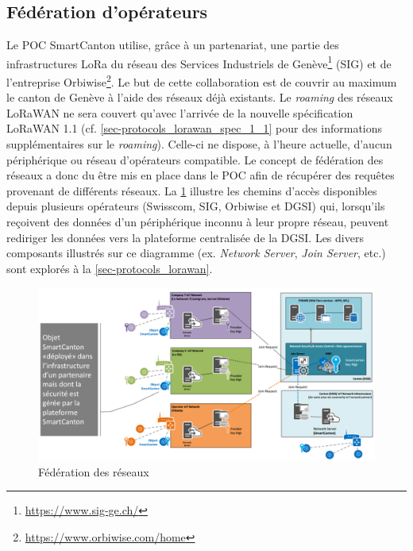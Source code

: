 \subsection{Fédération d'opérateurs}
\label{sec-stateoftheart_smartcanton_federation}

Le POC SmartCanton utilise, grâce à un partenariat, une partie des infrastructures LoRa du réseau des Services Industriels de Genève\footnote{\url{https://www.sig-ge.ch/}} (SIG) et de l'entreprise Orbiwise\footnote{\url{https://www.orbiwise.com/home}}. Le but de cette collaboration est de couvrir au maximum le canton de Genève à l'aide des réseaux déjà existants.
Le \textit{roaming} des réseaux LoRaWAN ne sera couvert qu'avec l'arrivée de la nouvelle spécification LoRaWAN 1.1 (cf. \cref{sec-protocols_lorawan_spec_1_1} pour des informations supplémentaires sur le \textit{roaming}). Celle-ci ne dispose, à l'heure actuelle, d'aucun périphérique ou réseau d'opérateurs compatible.
Le concept de fédération des réseaux a donc du être mis en place dans le POC afin de récupérer des requêtes provenant de différents réseaux. La \cref{fig-federation_network} illustre les chemins d'accès disponibles depuis plusieurs opérateurs (Swisscom, SIG, Orbiwise et DGSI) qui, lorsqu'ils reçoivent des données d'un périphérique inconnu à leur propre réseau, peuvent rediriger les données vers la plateforme centralisée de la DGSI. Les divers composants illustrés sur ce diagramme (ex. \textit{Network Server}, \textit{Join Server}, etc.) sont explorés à la \cref{sec-protocols_lorawan}.



\begin{figure}[ht!]
    \centering
    \includegraphics[width=1.0\textwidth]{Figures/StateOfTheArt/SmartCanton/federation_network.png}
    \caption{Fédération des réseaux}
    \label{fig-federation_network}
\end{figure}






